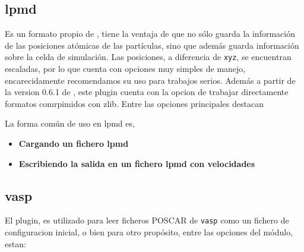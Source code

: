 \subsection{lpmd}\label{subsec:lpmdformato}

Es un formato propio de {\lpmd}, tiene la ventaja de que no s\'olo guarda la informaci\'on de las posiciones at\'omicas de las part\'iculas, sino que adem\'as guarda informaci\'on sobre la celda de simulaci\'on. Las posiciones, a diferencia de \verb|xyz|, se encuentran escaladas, por lo que cuenta con opciones muy simples de manejo, encarecidamente recomendamos su uso para trabajos serios. Adem\'as a partir de la version 0.6.1 de {\lpmd}, este plugin cuenta con la opcion de trabajar directamente formatos comrpimidos con zlib. Entre las opciones principales destacan


La forma com\'un de uso en lpmd es,

\begin{itemize}
 \item \textbf{Cargando un fichero lpmd}
 \item \textbf{Escribiendo la salida en un fichero lpmd con velocidades}
\end{itemize}

\subsection{vasp}
El plugin, es utilizado para leer ficheros POSCAR de \verb|vasp| como un fichero de configuracion inicial, o bien para otro prop\'osito, entre las opciones del m\'odulo, estan:

